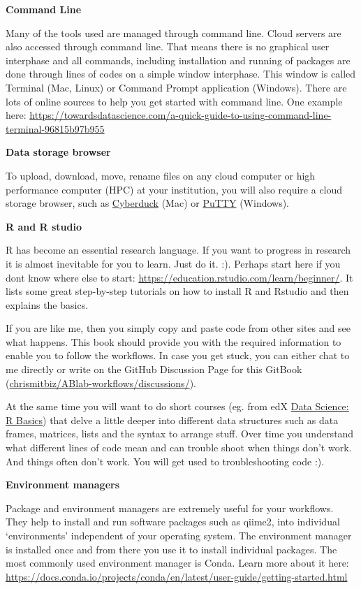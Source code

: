 \documentclass[
]{book}
\begin{document}
\textbf{Command Line}

Many of the tools used are managed through command line. Cloud servers are also accessed through command line. That means there is no graphical user interphase and all commands, including installation and running of packages are done through lines of codes on a simple window interphase. This window is called Terminal (Mac, Linux) or Command Prompt application (Windows). There are lots of online sources to help you get started with command line. One example here: \url{https://towardsdatascience.com/a-quick-guide-to-using-command-line-terminal-96815b97b955}

\textbf{Data storage browser}

To upload, download, move, rename files on any cloud computer or high performance computer (HPC) at your institution, you will also require a cloud storage browser, such as \href{https://docs.cyberduck.io/}{Cyberduck} (Mac) or \href{https://www.putty.org/}{PuTTY} (Windows).

\textbf{R and R studio}

R has become an essential research language. If you want to progress in research it is almost inevitable for you to learn. Just do it. :). Perhaps start here if you dont know where else to start: \url{https://education.rstudio.com/learn/beginner/}. It lists some great step-by-step tutorials on how to install R and Rstudio and then explains the basics.

If you are like me, then you simply copy and paste code from other sites and see what happens. This book should provide you with the required information to enable you to follow the workflows. In case you get stuck, you can either chat to me directly or write on the GitHub Discussion Page for this GitBook (\href{(https://github.com/chrismitbiz/ABlab-workflows/discussions/)}{chrismitbiz/ABlab-workflows/discussions/}).

At the same time you will want to do short courses (eg. from edX \href{https://www.edx.org/course/data-science-r-basics}{Data Science: R Basics}) that delve a little deeper into different data structures such as data frames, matrices, lists and the syntax to arrange stuff. Over time you understand what different lines of code mean and can trouble shoot when things don't work. And things often don't work. You will get used to troubleshooting code :).

\textbf{Environment managers}

Package and environment managers are extremely useful for your workflows. They help to install and run software packages such as qiime2, into individual `environments' independent of your operating system. The environment manager is installed once and from there you use it to install individual packages. The most commonly used environment manager is Conda. Learn more about it here: \url{https://docs.conda.io/projects/conda/en/latest/user-guide/getting-started.html}
\end{document}
